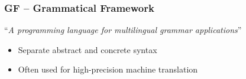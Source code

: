 \begin{frame}
    \frametitle{GF -- Grammatical Framework}
    ``\textit{A programming language for multilingual grammar applications}''

    \begin{itemize}
        \item Separate abstract and concrete syntax
        \item Often used for high-precision machine translation
    \end{itemize}

    \centering
\end{frame}

